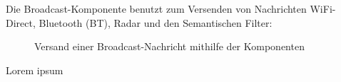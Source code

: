 Die Broadcast-Komponente benutzt zum Versenden von Nachrichten WiFi-Direct, Bluetooth (BT), Radar und den Semantischen Filter:
\begin{figure}[H]
	\centering
	\hspace*{1cm}
	\caption{Versand einer Broadcast-Nachricht mithilfe der Komponenten}
	\label{fig:broadcastComps}
\end{figure}
Lorem ipsum
